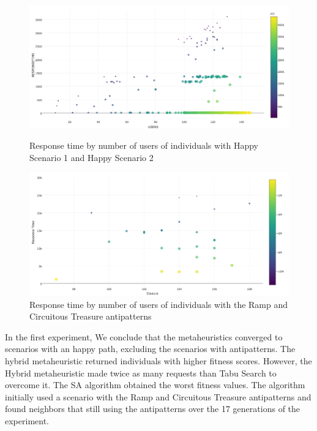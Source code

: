\begin{figure}[h]
\begin{minipage}{.5\textwidth}
\centering
\includegraphics[width=1\textwidth]{./images/experiment1-7.png}
\caption{Response time by number of users of individuals with Happy Scenario 1 and Happy Scenario 2}
\label{fig:responsetimegenerationalltests1}
\end{minipage}
\begin{minipage}{.5\textwidth}
\centering
\includegraphics[width=1\textwidth]{./images/experiment1-8.png}
\caption{Response time by number of users of individuals with the Ramp and Circuitous Treasure antipatterns}
\label{fig:fitnessgenerationalltests1-1}
\end{minipage}
\end{figure}

In the first experiment, We conclude that the metaheuristics converged to scenarios with an happy path, excluding the scenarios with antipatterns. The hybrid metaheuristic returned individuals with higher fitness scores. However, the Hybrid metaheuristic made twice as many requests than Tabu Search to overcome it. The SA algorithm obtained the worst fitness values. The algorithm initially used a scenario with the Ramp and Circuitous Treasure antipatterns  and found neighbors that still using the antipatterns over the 17 generations of the experiment.





